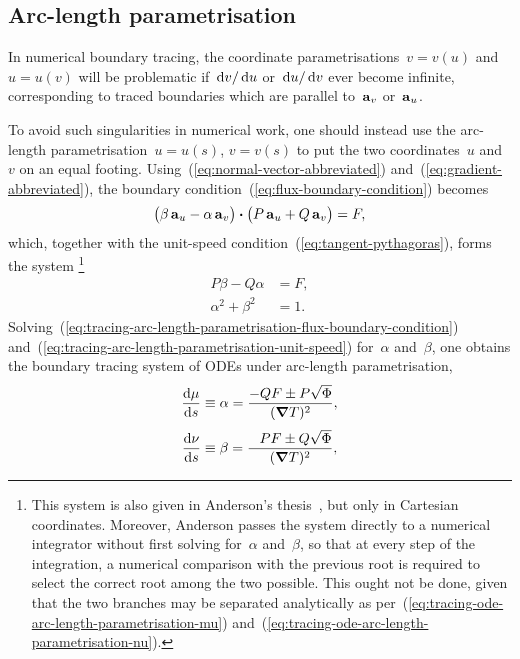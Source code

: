 \subsection{Arc-length parametrisation}
\label{sec:curvilinear.tracing.arc-length}

In numerical boundary tracing,
the coordinate parametrisations~$v = v (u)$ and~$u = u (v)$
will be problematic
if~$\td v / \td u$ or~$\td u / \td v$ ever become infinite,
corresponding to traced boundaries
which are parallel to~$\basisvec{v}$ or~$\basisvec{u}$.

To avoid such singularities in numerical work, one should instead use
the arc-length parametrisation~$u = u (s)$, $v = v(s)$
to put the two coordinates~$u$ and~$v$ on an equal footing.
Using~(\ref{eq:normal-vector-abbreviated})
and~(\ref{eq:gradient-abbreviated}),
the boundary condition~(\ref{eq:flux-boundary-condition}) becomes
\[
  \roundbr[\big]{\beta \basisvec{u} - \alpha \basisvec{v}}
    \dotp
  \roundbr[\big]{P \basisvec{u} + Q \basisvec{v}}
    =
  F,
\]
which, together with the unit-speed condition~(\ref{eq:tangent-pythagoras}),
forms the system%
\footnote{
  This system is also given
  in Anderson's thesis~\cite{anderson-2002-thesis-boundary-tracing-pdes},
  but only in Cartesian coordinates.
  Moreover, Anderson passes the system directly to a numerical integrator
  without first solving for~$\alpha$ and~$\beta$,
  so that at every step of the integration,
  a numerical comparison with the previous root
  is required to select the correct root among the two possible.
  This ought not be done,
  given that the two branches may be separated analytically
  as per~(\ref{eq:tracing-ode-arc-length-parametrisation-mu})
  and~(\ref{eq:tracing-ode-arc-length-parametrisation-nu}).
}
\begin{align}
  P \beta - Q \alpha &= F,
    \label{eq:tracing-arc-length-parametrisation-flux-boundary-condition} \\
  \alpha^2 + \beta^2 &= 1.
    \label{eq:tracing-arc-length-parametrisation-unit-speed}
\end{align}
Solving~(\ref{eq:tracing-arc-length-parametrisation-flux-boundary-condition})
and~(\ref{eq:tracing-arc-length-parametrisation-unit-speed})
for~$\alpha$ and~$\beta$, one obtains
the boundary tracing system of ODEs under arc-length parametrisation,
\begin{align}
  \tder{\mu}{s} &\defeq \alpha = \frac{-Q F \pm P \sqrt{\Phi}}{(\del T)^2},
    \label{eq:tracing-ode-arc-length-parametrisation-mu} \\[\fraclinespace]
  \tder{\nu}{s} &\defeq \beta = \frac{\+P F \pm Q \sqrt{\Phi}}{(\del T)^2},
    \label{eq:tracing-ode-arc-length-parametrisation-nu}
\end{align}
